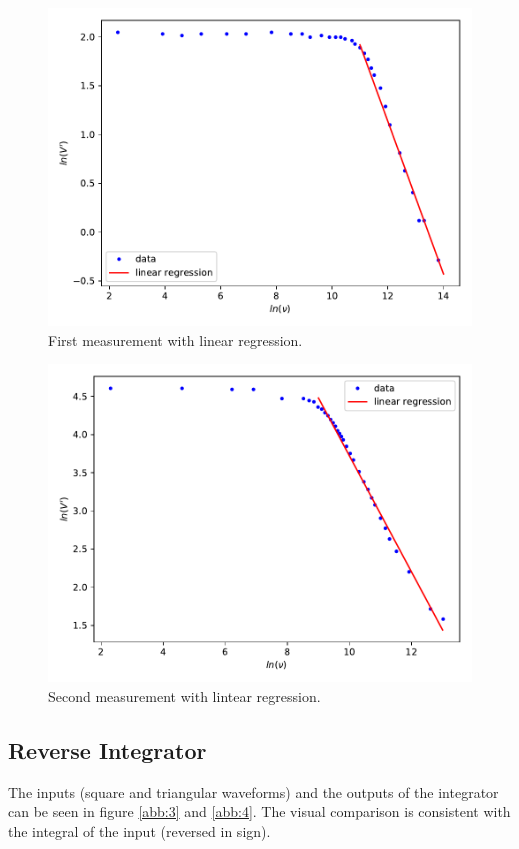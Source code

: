 \begin{figure}
  \centering
  \includegraphics[scale=0.7]{A1.pdf}
  \caption{First measurement with linear regression.}
  \label{abb:1}
\end{figure}
\begin{figure}
  \centering
  \includegraphics[scale=0.7]{A2.pdf}
  \caption{Second measurement with lintear regression.}
  \label{abb:2}
\end{figure}

\subsection{Reverse Integrator}
The inputs (square and triangular waveforms) and the outputs of the integrator
can be seen in figure \ref{abb:3} and \ref{abb:4}. The visual comparison is
consistent with the integral of the input (reversed in sign).


